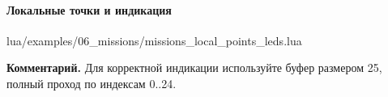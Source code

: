 \paragraph{Локальные точки и индикация}
\begin{codefile}{lua/examples/06_missions/missions_local_points_leds.lua}
\end{codefile}
\textbf{Комментарий.} Для корректной индикации используйте буфер размером 25, полный проход по индексам 0..24.
